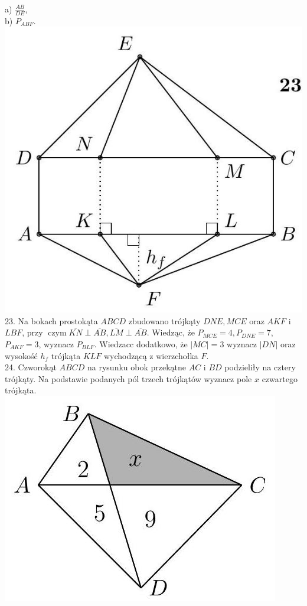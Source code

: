 \documentclass[10pt]{article}
\begin{document}
a) \(\frac{A B}{D E}\),\\
b) \(P_{A B F}\).\\
\includegraphics[max width=\textwidth, center]{2024_11_21_71f62bd117d375398909g-035(2)}\\
23. Na bokach prostokąta \(A B C D\) zbudowano trójkąty \(D N E, M C E\) oraz \(A K F\) i \(L B F\), przy \(\operatorname{czym} \overline{K N} \perp \overline{A B}, \overline{L M} \perp \overline{A B}\). Wiedząc, że \(P_{M C E}=4, P_{D N E}=7\), \(P_{A K F}=3\), wyznacz \(P_{B L F}\). Wiedzacc dodatkowo, że \(|M C|=3\) wyznacz \(|D N|\) oraz wysokość \(h_{f}\) trójkąta \(K L F\) wychodzącą z wierzchołka \(F\).\\
24. Czworokąt \(A B C D\) na rysunku obok przekątne \(A C\) i \(B D\) podzieliły na cztery trójkąty. Na podstawie podanych pól trzech trójkątów wyznacz pole \(x\) czwartego trójkąta.\\
\includegraphics[max width=\textwidth, center]{2024_11_21_71f62bd117d375398909g-036}\\
\end{document}
